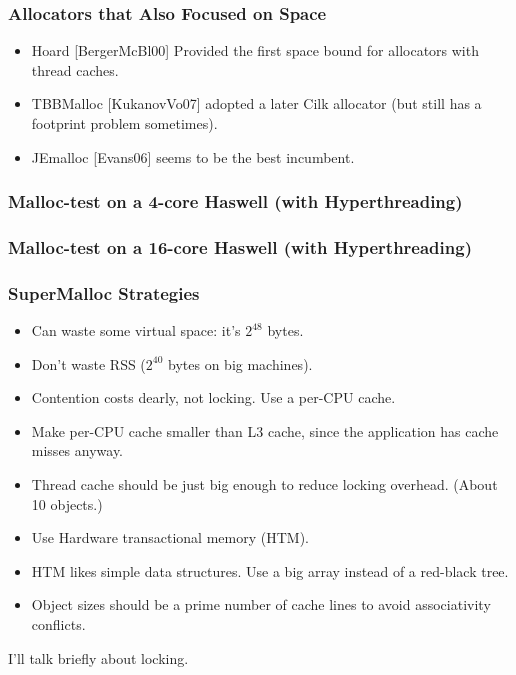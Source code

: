 \documentclass[xcolor=dvipsnames,14pt]{beamer}
\begin{document}
\begin{frame}[fragile]
\frametitle{Allocators that Also Focused on Space}

\begin{itemize}
\item Hoard [BergerMcBl00] Provided the first space bound for allocators
with thread caches.
\item TBBMalloc [KukanovVo07] adopted a later Cilk allocator (but still has a footprint problem sometimes).
\item JEmalloc [Evans06] seems to be the best incumbent.
\end{itemize}


\end{frame}

\begin{frame}
\frametitle{Malloc-test on a 4-core Haswell (with Hyperthreading)}


\end{frame}
\begin{frame}
\frametitle{Malloc-test on a 16-core Haswell (with Hyperthreading)}


\end{frame}

\begin{frame}
\frametitle{SuperMalloc Strategies}

\begin{itemize}
\item Can waste some virtual space: it's $2^{48}$ bytes.
\item Don't waste RSS ($2^{40}$ bytes on big machines).
\item Contention costs dearly, not locking.  Use a per-CPU cache.
\item Make per-CPU cache smaller than L3 cache, since the application
  has cache misses anyway.
\item Thread cache should be just big enough to reduce locking overhead.  (About 10 objects.)
\item Use Hardware transactional memory (HTM).
\item HTM likes simple data structures.  Use a big array instead of a red-black tree.
\item Object sizes should be a prime number of cache lines to avoid associativity conflicts.
\end{itemize}

I'll talk briefly about locking.
\end{frame}
\end{document}
